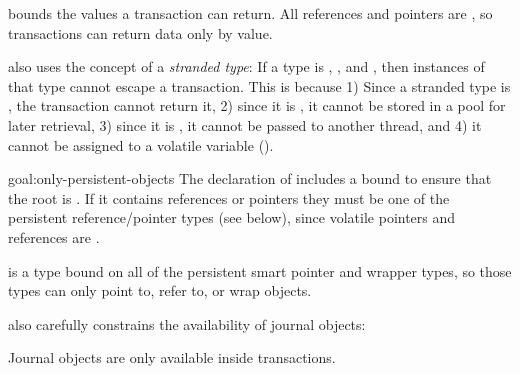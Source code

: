\begin{discuss}

\end{discuss}



 bounds the values a transaction can return.  All references
and pointers are , so transactions can return data only by
value.

\This{} also uses the concept of a \emph{stranded type}: If a type is
, , and , then instances of that type
cannot escape a transaction.  This is because 1) Since a stranded type is
, the transaction cannot return it, 2) since it is
, it cannot be stored in a pool for later retrieval, 3) since it is
, it cannot be passed to another thread, and 4) it cannot be assigned 
to a volatile variable ().


\begin{goaltrue}{goal:only-persistent-objects}
  The declaration of  includes a bound to ensure that the root is
  .  If it contains references or pointers they must be one of
  the persistent reference/pointer types (see below), since volatile pointers
  and references are .
  
   is a type bound on all of the persistent smart pointer and wrapper
  types, so those types can only point to, refer to, or wrap 
  objects.
\end{goaltrue}

\This{} also carefully constrains the availability of journal objects:


\begin{invar}
  \label{inv:tx-journal-only} 
  Journal objects are only available inside transactions.  
\end{invar}

